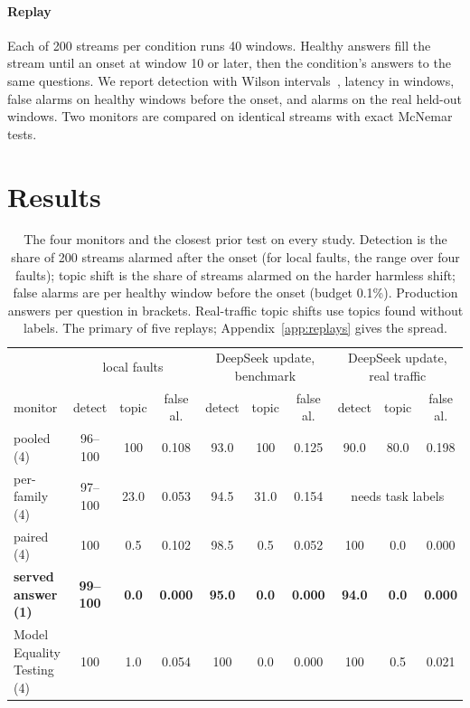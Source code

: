 \documentclass[11pt]{article}
\begin{document}
\paragraph{Replay} Each of 200 streams per condition runs 40 windows. Healthy
answers fill the stream until an onset at window 10 or later, then the condition's
answers to the same questions. We report detection with Wilson
intervals~\citep{wilson1927probable}, latency in windows, false alarms on healthy
windows before the onset, and alarms on the real held-out windows. Two monitors
are compared on identical streams with exact McNemar tests.

\section{Results}
\label{sec:results}

\begin{table}[t]
  \centering\small
  \caption{The four monitors and the closest prior test on every study. Detection
  is the share of 200 streams alarmed after the onset (for local faults, the range
  over four faults); topic shift is the share of streams alarmed on the harder
  harmless shift; false alarms are per healthy window before the onset (budget
  0.1\%). Production answers per question in brackets. Real-traffic topic shifts
  use topics found without labels. The primary of five replays; Appendix~\ref{app:replays}
  gives the spread.}
  \label{tab:monitors}
  \setlength{\tabcolsep}{3.6pt}
  \begin{tabular}{l|ccc|ccc|ccc}
    \toprule
    & \multicolumn{3}{c|}{local faults} & \multicolumn{3}{c|}{DeepSeek update, benchmark} & \multicolumn{3}{c}{DeepSeek update, real traffic} \\
    monitor & detect & topic & false al. & detect & topic & false al. & detect & topic & false al. \\
    \midrule
    pooled (4) & 96--100 & 100 & 0.108 & 93.0 & 100 & 0.125 & 90.0 & 80.0 & 0.198 \\
    per-family (4) & 97--100 & 23.0 & 0.053 & 94.5 & 31.0 & 0.154 & \multicolumn{3}{c}{needs task labels} \\
    paired (4) & 100 & 0.5 & 0.102 & 98.5 & 0.5 & 0.052 & 100 & 0.0 & 0.000 \\
    \textbf{served answer (1)} & \textbf{99--100} & \textbf{0.0} & \textbf{0.000} & \textbf{95.0} & \textbf{0.0} & \textbf{0.000} & \textbf{94.0} & \textbf{0.0} & \textbf{0.000} \\
    \midrule
    Model Equality Testing (4) & 100 & 1.0 & 0.054 & 100 & 0.0 & 0.000 & 100 & 0.5 & 0.021 \\
    \bottomrule
  \end{tabular}
\end{table}
\end{document}
